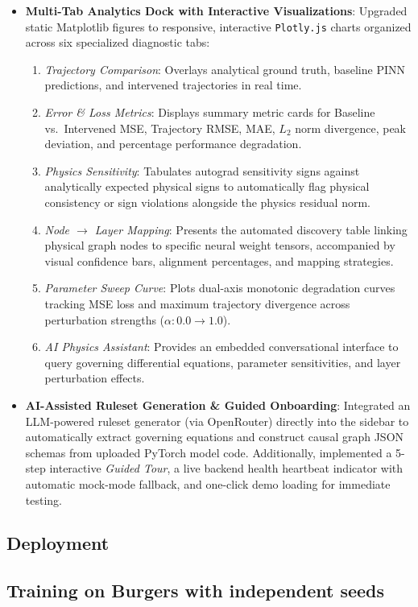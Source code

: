 \documentclass[12pt,singleside,a4paper]{article}
\begin{document}
\begin{itemize}
    \item \textbf{Multi-Tab Analytics Dock with Interactive Visualizations}: Upgraded static Matplotlib figures to responsive, interactive \texttt{Plotly.js} charts organized across six specialized diagnostic tabs:
    \begin{enumerate}
        \item \textit{Trajectory Comparison}: Overlays analytical ground truth, baseline PINN predictions, and intervened trajectories in real time.
        \item \textit{Error \& Loss Metrics}: Displays summary metric cards for Baseline vs.\ Intervened MSE, Trajectory RMSE, MAE, $L_2$ norm divergence, peak deviation, and percentage performance degradation.
        \item \textit{Physics Sensitivity}: Tabulates autograd sensitivity signs against analytically expected physical signs to automatically flag physical consistency or sign violations alongside the physics residual norm.
        \item \textit{Node $\rightarrow$ Layer Mapping}: Presents the automated discovery table linking physical graph nodes to specific neural weight tensors, accompanied by visual confidence bars, alignment percentages, and mapping strategies.
        \item \textit{Parameter Sweep Curve}: Plots dual-axis monotonic degradation curves tracking MSE loss and maximum trajectory divergence across perturbation strengths ($\alpha : 0.0 \rightarrow 1.0$).
        \item \textit{AI Physics Assistant}: Provides an embedded conversational interface to query governing differential equations, parameter sensitivities, and layer perturbation effects.
    \end{enumerate}
    \item \textbf{AI-Assisted Ruleset Generation \& Guided Onboarding}: Integrated an LLM-powered ruleset generator (via OpenRouter) directly into the sidebar to automatically extract governing equations and construct causal graph JSON schemas from uploaded PyTorch model code. Additionally, implemented a 5-step interactive \textit{Guided Tour}, a live backend health heartbeat indicator with automatic mock-mode fallback, and one-click demo loading for immediate testing.
\end{itemize}
\subsection{Deployment}
\subsection{Training on Burgers with independent seeds}
\end{document}

